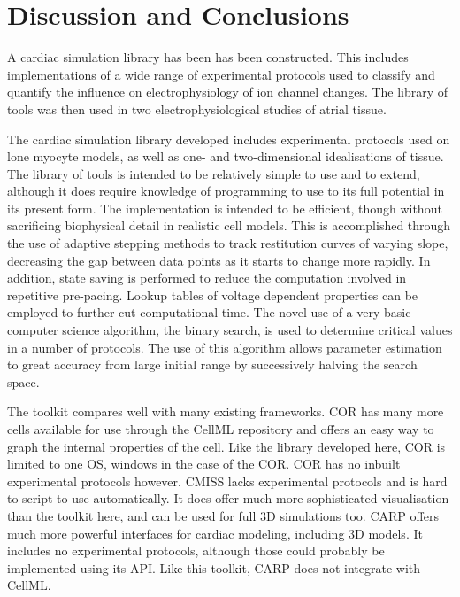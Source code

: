 \section{Discussion and Conclusions}

A cardiac simulation library has been has been constructed.
This includes implementations of a wide range of experimental protocols used to
classify and quantify the influence on electrophysiology of ion channel changes.
The library of tools was then used in two electrophysiological studies of atrial
tissue.

The cardiac simulation library developed includes experimental protocols used on
lone myocyte models, as well as one- and two-dimensional idealisations of
tissue.
The library of tools is intended to be relatively simple to use and to extend,
although it does require knowledge of programming to use to its full potential
in its present form.
The implementation is intended to be efficient, though without sacrificing
biophysical detail in realistic cell models.
This is accomplished through the use of adaptive stepping methods to track
restitution curves of varying slope, decreasing the gap between data points as
it starts to change more rapidly.
In addition, state saving is performed to reduce the computation involved in
repetitive pre-pacing.
Lookup tables of voltage dependent properties can be employed to further cut
computational time.
The novel use of a very basic computer science algorithm, the binary search, is
used to determine critical values in a number of protocols.
The use of this algorithm allows parameter estimation to great accuracy from
large initial range by successively halving the search space.

The toolkit compares well with many existing frameworks.
COR has many more cells available for use through the CellML repository and
offers an easy way to graph the internal properties of the cell.
Like the library developed here, COR is limited to one OS, windows in the case
of the COR.
COR has no inbuilt experimental protocols however.
CMISS lacks experimental protocols and is hard to script to use automatically.
It does offer much more sophisticated visualisation than the toolkit here, and
can be used for full 3D simulations too.
CARP offers much more powerful interfaces for cardiac modeling, including 3D
models.
It includes no experimental protocols, although those could probably be
implemented using its API.
Like this toolkit, CARP does not integrate with CellML.

